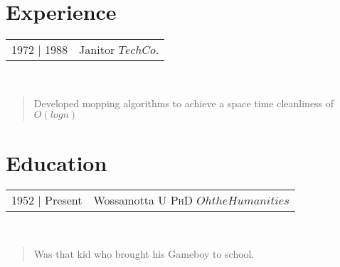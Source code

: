 \documentclass{article}
\begin{document}
	\begin{minipage}[t]{.675\textwidth}
		\section{Experience}
			\begin{tabular}{l | l}
				1972 | 1988 & Janitor $Tech Co.$
			\end{tabular}\titlerule\\
			
			\begin{quote}			
				
				Developed mopping algorithms to achieve a space time cleanliness of $O(logn)$
			\end{quote}
			
		\section{Education}
			\begin{tabular}{l | l}
				1952 | Present & Wossamotta U \textsc{PhD} $Oh the Humanities$\par			
			\end{tabular}\titlerule\\

			\begin{quote}
				
				Was that kid who brought his Gameboy to school.
			\end{quote}						
	\end{minipage}
\end{document}
